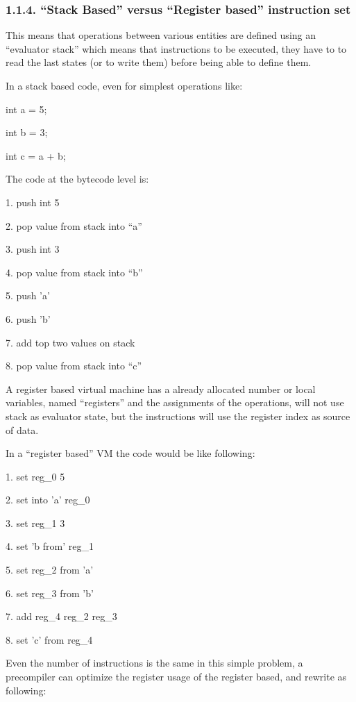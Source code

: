 \documentclass[letterpaper]{article}
\begin{document}
\bigskip

\subsubsection{1.1.4. ``Stack Based'' versus ``Register based'' instruction set}
This means that operations between various entities are defined using an ``evaluator stack'' which means that
instructions to be executed, they have to to read the last states (or to write them) before being able to define them.

In a stack based code, even for simplest operations like:

int a = 5; 

int b = 3;

int c = a + b;

The code at the bytecode level is:

1. push int 5

2. pop value from stack into ``a''

3. push int 3

4. pop value from stack into ``b''

5. push 'a'

6. push 'b'

7. add top two values on stack

8. pop value from stack into ``c''


\bigskip


\bigskip

A register based virtual machine has a already allocated number or local variables, named ``registers'' and the
assignments of the operations, will not use stack as evaluator state, but the instructions will use the register index
as source of data. 

In a ``register based'' VM the code would be like following:

1. set reg\_0 5

2. set into 'a' reg\_0

3. set reg\_1 3 

4. set 'b from' reg\_1

5. set reg\_2 from 'a'

6. set reg\_3 from 'b'

7. add reg\_4 reg\_2 reg\_3

8. set 'c' from reg\_4


\bigskip

Even the number of instructions is the same in this simple problem, a precompiler can optimize the register usage of the
register based, and rewrite as following:
\end{document}

